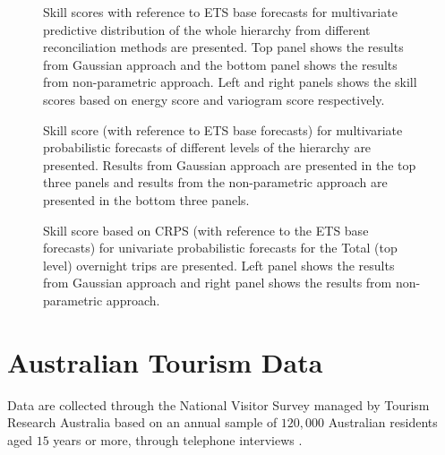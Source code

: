 \documentclass[12pt]{article}
\theoremstyle{definition}
\begin{document}
\begin{figure}[!hbt]
	\centering
	\small
	\caption{Skill scores with reference to ETS base forecasts for multivariate predictive distribution of the whole hierarchy from different reconciliation methods are presented. Top panel shows the results from Gaussian approach and the bottom panel shows the results from non-parametric approach. Left and right panels shows the skill scores based on energy score and variogram score respectively.}\label{fig:EmpResults_AllTS_ETS}
\end{figure}

\begin{figure}[!hbt]
	\centering
	\small
	\caption{Skill score (with reference to ETS base forecasts) for multivariate probabilistic forecasts of different levels of the hierarchy are presented. Results from Gaussian approach are presented in the top three panels and results from the non-parametric approach are presented in the bottom three panels.}\label{fig:EmpResults_Levels_ETS}
\end{figure}

\begin{figure}[!hbt]
	\centering
	\small
	\caption{Skill score based on CRPS (with reference to the ETS base forecasts) for univariate probabilistic forecasts for the Total (top level) overnight trips are presented. Left panel shows the results from Gaussian approach and right panel shows the results from non-parametric approach. }\label{fig:EmpResults_TopLevel_ETS}
\end{figure}

\FloatBarrier

\clearpage

\section{Australian Tourism Data}\label{app:AustralianData}

Data are collected through the National Visitor Survey managed by Tourism Research Australia based on an annual sample of $120,000$ Australian residents aged $15$ years or more, through telephone interviews \citep{TourismResearch2019}.
\end{document}
